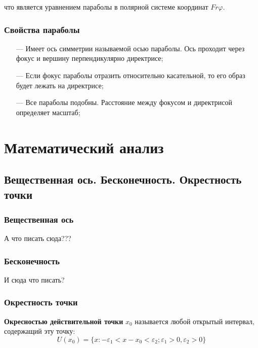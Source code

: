 \documentclass[a4paper,12pt]{extbook}
\theoremstyle{named}
\theoremstyle{named}
\begin{document}
что является уравнением параболы в полярной системе координат \(Fr\varphi\).

\subsection*{Свойства параболы}

\begin{itemize}
    \item[—]{Имеет ось симметрии называемой осью параболы. Ось проходит через фокус и вершину перпендикулярно директрисе;}
    \item[—]{Если фокус параболы отразить относительно касательной, то его образ будет лежать на директрисе;}
    \item[—]{Все параболы подобны. Расстояние между фокусом и директрисой определяет масштаб;}
\end{itemize}



\chapter{Математический анализ}

\section{Вещественная ось. Бесконечность. Окрестность точки}%
\label{sec:Вещественная ось. Бесконечность. Окрестность точки}

\subsection*{Вещественная ось}%
\label{sub:Вещественная ось}
А что писать сюда???

\subsection*{Бесконечность}%
\label{sub:Бесконечность}
И сюда что писать?

\subsection*{Окрестность точки}%
\label{sub:Окрестность точки}

\textbf{Окресностью действительной точки} \(x_0\) называется любой открытый интервал, содержащий эту точку:
\[
    U(x_0) = \{x: -\varepsilon_1 < x - x_0 < \varepsilon_2; \varepsilon_1 > 0, \varepsilon_2 > 0\}
\]
\end{document}
